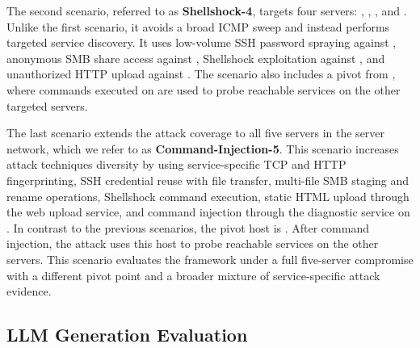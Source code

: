 \documentclass[sigconf]{acmart}
\begin{document}
The second scenario, referred to as \textbf{Shellshock-4}, targets four servers: , , , and . Unlike the first scenario, it avoids a broad ICMP sweep and instead performs targeted service discovery. It uses low-volume SSH password spraying against , anonymous SMB share
access against , Shellshock exploitation against
, and unauthorized HTTP upload against
. The scenario also includes a pivot from
, where commands executed on  are used to probe reachable services on the other targeted servers.

The last scenario extends the attack coverage to all five servers in the server network, which we refer to as \textbf{Command-Injection-5}. This scenario increases attack techniques diversity by using service-specific TCP and HTTP fingerprinting, SSH credential reuse with file transfer, multi-file SMB staging and rename operations, Shellshock command
execution, static HTML upload through the web upload service, and command injection through the diagnostic service on . In contrast to the previous scenarios, the pivot host is . After command injection, the attack uses this host to probe reachable services on the other servers. This scenario evaluates the framework under a full five-server compromise with a different pivot point and a broader mixture of service-specific attack evidence.

\subsection{LLM Generation Evaluation}
\end{document}
